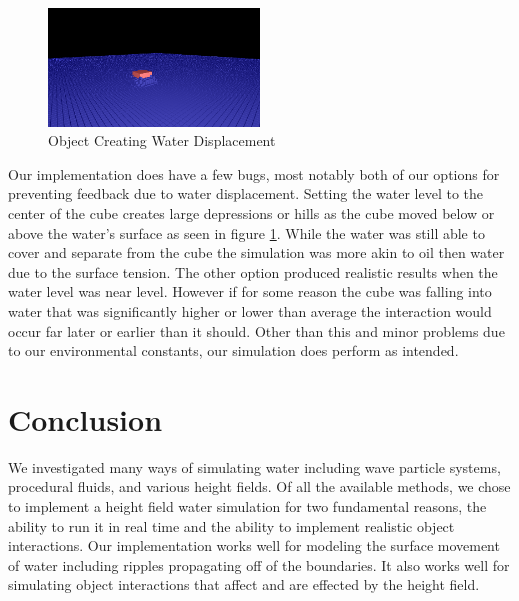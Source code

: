 \documentclass[11pt]{article}
\begin{document}
\begin{figure}[H]
    \caption{Object Creating Water Displacement}
    \label{fig:displacement}
    \centering
    \includegraphics[width=0.5\textwidth]{../www/images/objectWaterDisplacement}
\end{figure}

Our implementation does have a few bugs, most notably both of our options for 
preventing feedback due to water displacement.  Setting the water level to the 
center of the cube creates large depressions or hills as the cube moved below 
or above the water’s surface as seen in figure \ref{fig:displacement}.  While 
the water was still able to cover and separate from the cube the simulation was 
more akin to oil then water due to the surface tension.  The other option 
produced realistic results when the water level was near level.  However if for 
some reason the cube was falling into water that was significantly higher or 
lower than average the interaction would occur far later or earlier than it 
should.  Other than this and minor problems due to our environmental constants, 
our simulation does perform as intended.

\section{Conclusion}

We investigated many ways of simulating water including wave particle systems, 
procedural fluids, and various height fields. Of all the available methods, we 
chose to implement a height field water simulation for two fundamental reasons, 
the ability to run it in real time and the ability to implement realistic 
object interactions. Our implementation works well for modeling the surface 
movement of water including ripples propagating off of the boundaries. It also 
works well for simulating object interactions that affect and are effected by 
the height field.
\end{document}
